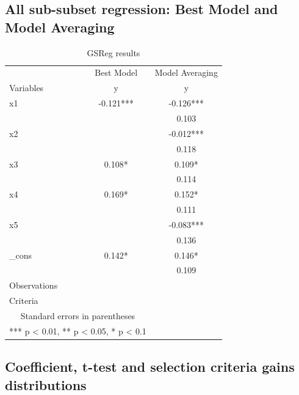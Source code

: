 \documentclass{article}
\begin{document}
\subsection{All sub-subset regression: Best Model and Model Averaging}

\begin{table}[!h]
  \centering
  \caption{GSReg results}
    
    \begin{tabular}{l c c}
    \hline
    \hline
                 &  Best Model               & Model Averaging            \\
    Variables    &  y               & y                 \\
    \hline 
    x1     & -0.121***  & -0.126***     \\
                 &              & 0.103  \\
     
    x2     &   & -0.012***     \\
                 &              & 0.118  \\
     
    x3     & 0.108*  & 0.109*     \\
                 &              & 0.114  \\
     
    x4     & 0.169*  & 0.152*     \\
                 &              & 0.111  \\
     
    x5     &   & -0.083***     \\
                 &              & 0.136  \\
     
    _cons     & 0.142*  & 0.146*     \\
                 &              & 0.109  \\
    \hline

    Observations &   \multicolumn{ 1  }{c}{ } \\
    Criteria     &   \multicolumn{ 1  }{c}{ } \\
    \hline
    \hline
    \multicolumn{ 2  }{c}{Standard errors in parentheses} \\
    \multicolumn{ 2  }{c}{*** p < 0.01, ** p < 0.05, * p < 0.1} \\
    \end{tabular}
  \label{tab:addlabel}
\end{table}

\subsection{Coefficient, t-test and selection criteria gains distributions}
\end{document}
